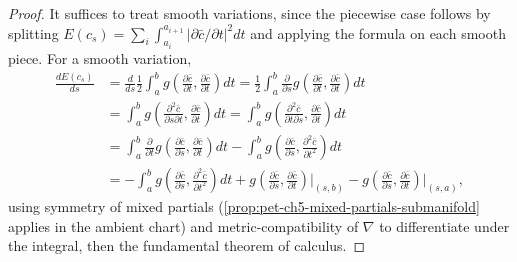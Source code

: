 \begin{proof}
  \leanok
  It suffices to treat smooth variations, since the piecewise case follows by
  splitting $E(c_s)=\sum_i\int_{a_i}^{a_{i+1}}|\partial\bar c/\partial t|^2dt$ and
  applying the formula on each smooth piece. For a smooth variation,
  \begin{align*}
    \frac{dE(c_s)}{ds}
    &=\frac{d}{ds}\frac12\int_a^bg\!\left(\frac{\partial\bar c}{\partial t},\frac{\partial\bar c}{\partial t}\right)dt
    =\frac12\int_a^b\frac{\partial}{\partial s}g\!\left(\frac{\partial\bar c}{\partial t},\frac{\partial\bar c}{\partial t}\right)dt\\
    &=\int_a^bg\!\left(\frac{\partial^2\bar c}{\partial s\partial t},\frac{\partial\bar c}{\partial t}\right)dt
    =\int_a^bg\!\left(\frac{\partial^2\bar c}{\partial t\partial s},\frac{\partial\bar c}{\partial t}\right)dt\\
    &=\int_a^b\frac{\partial}{\partial t}g\!\left(\frac{\partial\bar c}{\partial s},\frac{\partial\bar c}{\partial t}\right)dt
      -\int_a^bg\!\left(\frac{\partial\bar c}{\partial s},\frac{\partial^2\bar c}{\partial t^2}\right)dt\\
    &=-\int_a^bg\!\left(\frac{\partial\bar c}{\partial s},\frac{\partial^2\bar c}{\partial t^2}\right)dt
      +g\!\left(\frac{\partial\bar c}{\partial s},\frac{\partial\bar c}{\partial t}\right)\Big|_{(s,b)}
      -g\!\left(\frac{\partial\bar c}{\partial s},\frac{\partial\bar c}{\partial t}\right)\Big|_{(s,a)},
  \end{align*}
  using symmetry of mixed partials (\cref{prop:pet-ch5-mixed-partials-submanifold}
  applies in the ambient chart) and metric-compatibility of $\nabla$ to differentiate
  under the integral, then the fundamental theorem of calculus.
\end{proof}

